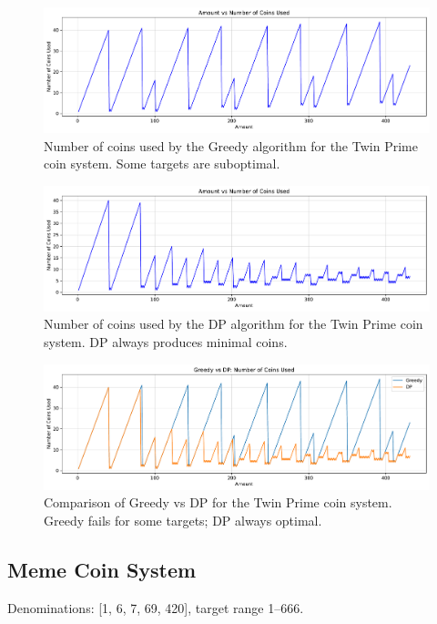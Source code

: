 \documentclass[12pt,a4paper]{report}
\begin{document}
\begin{figure}[H]
  \centering
  \includegraphics[width=\textwidth]{graphs/greedy_coins_twin_prime_plot.pdf}
  \caption{Number of coins used by the Greedy algorithm for the Twin Prime coin system. Some targets are suboptimal.}
  \label{fig:greedy_coins_twin_prime_plot}
\end{figure}

\begin{figure}[H]
  \centering
  \includegraphics[width=\textwidth]{graphs/dp_coins_twin_prime_plot.pdf}
  \caption{Number of coins used by the DP algorithm for the Twin Prime coin system. DP always produces minimal coins.}
  \label{fig:dp_coins_twin_prime_plot}
\end{figure}

\begin{figure}[H]
  \centering
  \includegraphics[width=\textwidth]{graphs/compare_coins_twin_prime_plot.pdf}
  \caption{Comparison of Greedy vs DP for the Twin Prime coin system. Greedy fails for some targets; DP always optimal.}
  \label{fig:compare_coins_twin_prime_plot}
\end{figure}

\subsection{Meme Coin System}
Denominations: [1, 6, 7, 69, 420], target range 1--666.
\end{document}
